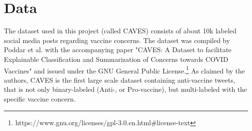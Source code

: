 \section{Data}
\label{sec:data}


The dataset used in this project (called CAVES) consists of about 10k labeled social media posts regarding vaccine concerns. The dataset was compiled by Poddar et al. with the accompanying paper "CAVES: A Dataset to facilitate Explainable Classification and Summarization of Concerns towards COVID Vaccines" \cite{poddar2022caves} and issued under the GNU General Public License.\footnote{https://www.gnu.org/licenses/gpl-3.0.en.html#license-text} As claimed by the authors, CAVES is the first large scale dataset containing anti-vaccine tweets, that is not only binary-labeled (Anti-, or Pro-vaccine), but multi-labeled with the specific vaccine concern.